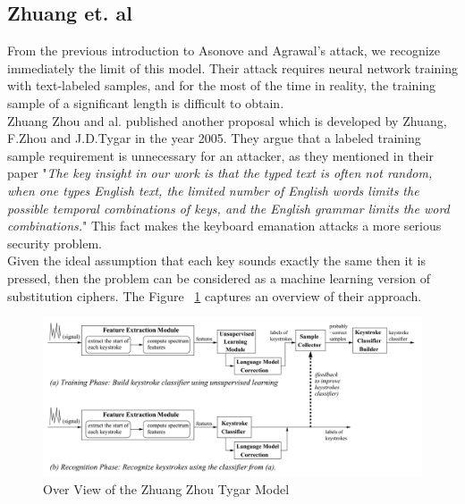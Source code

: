 \documentclass[12pt,a4paper]{article}
\begin{document}
\subsection{Zhuang et. al}

From the previous introduction to Asonove and Agrawal's attack, we recognize immediately the limit of this model. Their attack requires neural network training with text-labeled samples, and for the most of the time in reality, the training sample of a significant length is difficult to obtain.\\ 

Zhuang Zhou and al. published another proposal which is developed by Zhuang, F.Zhou and J.D.Tygar in the year 2005. They argue that a labeled training sample requirement is unnecessary for an attacker, as they mentioned in their paper "\textit{The key insight in our work is that the typed text is often not random, when one types English text, the limited number of English words limits the possible temporal combinations of keys, and the English grammar limits the word combinations.}" This fact makes the keyboard emanation attacks a more serious security problem.\\

Given the ideal assumption that each key sounds exactly the same then it is pressed,  then the problem can be considered as a machine learning version of substitution ciphers. The Figure ~\ref{fig:4} captures an overview of their approach.  \\


\begin{figure}[h]
\begin{center}
        \includegraphics[scale=0.38]{zhuangModel.png}
        \caption{Over View of the  Zhuang Zhou Tygar Model}
        \label{fig:4}
\end{center}
\end{figure} \par
\FloatBarrier 
\end{document}
